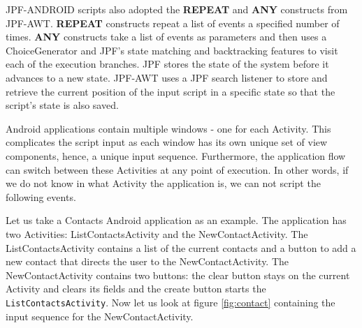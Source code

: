 \documentclass{acm_proc_article-sp}
\begin{document}
JPF-ANDROID scripts also adopted the \textbf{REPEAT} and \textbf{ANY} constructs from JPF-AWT. \textbf{REPEAT} constructs repeat a list of
events a specified number of times. \textbf{ANY} constructs take a list of events as parameters and then uses a ChoiceGenerator and JPF's
state matching and backtracking features to visit each of the execution branches. JPF stores the state of the system before it advances
to a new state. JPF-AWT uses a JPF search listener to store and retrieve the current position of the input script in a specific state so
that the script's state is also saved.

Android applications contain multiple windows - one for each Activity. This complicates the script input as each window has its own unique
set of view components, hence, a unique input sequence. Furthermore, the application flow can switch between these Activities
at any point of execution. In other words, if we do not know in what Activity the application is, we can not script the following events.

Let us take a Contacts Android application as an example. The application has two Activities: ListContactsActivity and the
NewContactActivity. The ListContactsActivity contains a list of the current contacts and a button to add a new contact that directs the
user to the NewContactActivity. The NewContactActivity contains two buttons: the clear button stays on the current Activity and clears its
fields and the create button starts the \texttt{ListContactsActivity}. Now let us look at figure \ref{fig:contact} containing the input
sequence for the NewContactActivity.
\end{document}
